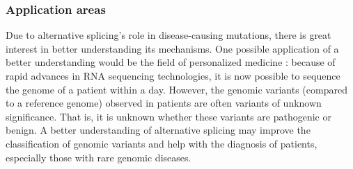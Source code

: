 \subsubsection{Application areas}
Due to alternative splicing's role in disease-causing mutations, there is great interest in better understanding its mechanisms. One possible application of a better understanding would be the field of personalized medicine \cite{overviewmlapproachestosplicing}: because of rapid advances in RNA sequencing technologies, it is now possible to sequence the genome of a patient within a day. However, the genomic variants (compared to a reference genome) observed in patients are often variants of unknown significance. That is, it is unknown whether these variants are pathogenic or benign. A better understanding of alternative splicing may improve the classification of genomic variants and help with the diagnosis of patients, especially those with rare genomic diseases.
